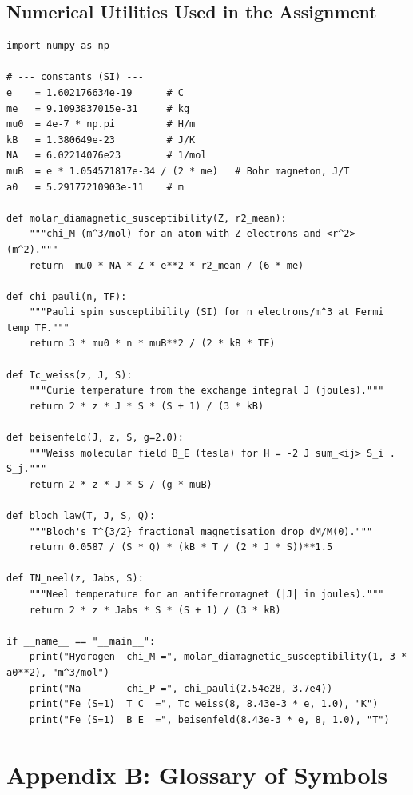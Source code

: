 \documentclass[11pt,a4paper]{article}
\begin{document}
\clearpage
\subsection{Numerical Utilities Used in the Assignment}

\begin{lstlisting}[caption={Constants and the formulae needed for the assignment answers.}]
import numpy as np

# --- constants (SI) ---
e    = 1.602176634e-19      # C
me   = 9.1093837015e-31     # kg
mu0  = 4e-7 * np.pi         # H/m
kB   = 1.380649e-23         # J/K
NA   = 6.02214076e23        # 1/mol
muB  = e * 1.054571817e-34 / (2 * me)   # Bohr magneton, J/T
a0   = 5.29177210903e-11    # m

def molar_diamagnetic_susceptibility(Z, r2_mean):
    """chi_M (m^3/mol) for an atom with Z electrons and <r^2> (m^2)."""
    return -mu0 * NA * Z * e**2 * r2_mean / (6 * me)

def chi_pauli(n, TF):
    """Pauli spin susceptibility (SI) for n electrons/m^3 at Fermi temp TF."""
    return 3 * mu0 * n * muB**2 / (2 * kB * TF)

def Tc_weiss(z, J, S):
    """Curie temperature from the exchange integral J (joules)."""
    return 2 * z * J * S * (S + 1) / (3 * kB)

def beisenfeld(J, z, S, g=2.0):
    """Weiss molecular field B_E (tesla) for H = -2 J sum_<ij> S_i . S_j."""
    return 2 * z * J * S / (g * muB)

def bloch_law(T, J, S, Q):
    """Bloch's T^{3/2} fractional magnetisation drop dM/M(0)."""
    return 0.0587 / (S * Q) * (kB * T / (2 * J * S))**1.5

def TN_neel(z, Jabs, S):
    """Neel temperature for an antiferromagnet (|J| in joules)."""
    return 2 * z * Jabs * S * (S + 1) / (3 * kB)

if __name__ == "__main__":
    print("Hydrogen  chi_M =", molar_diamagnetic_susceptibility(1, 3 * a0**2), "m^3/mol")
    print("Na        chi_P =", chi_pauli(2.54e28, 3.7e4))
    print("Fe (S=1)  T_C  =", Tc_weiss(8, 8.43e-3 * e, 1.0), "K")
    print("Fe (S=1)  B_E  =", beisenfeld(8.43e-3 * e, 8, 1.0), "T")
\end{lstlisting}

\clearpage

\section{Appendix B: Glossary of Symbols}
\label{app:glossary}
\end{document}
